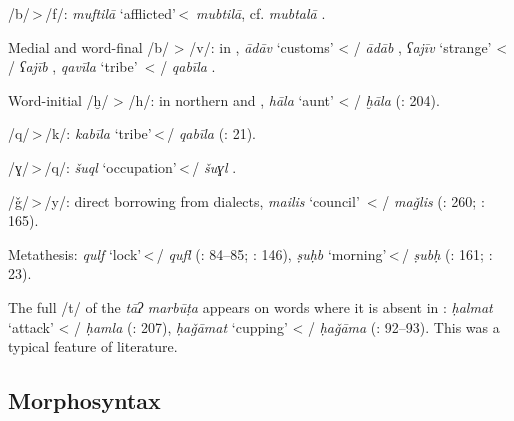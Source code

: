 \documentclass[output=paper]{langsci/langscibook}
\begin{document}
\begin{altdescription}
\item[/b/\,>\,/f/:] \emph{muftilā} ‘afflicted’\,<\, \textit{mubtilā}, cf.   \textit{mubtalā} \citep{Borjian2017}.

\item[Medial and word-final /b/ > /v/:]\sloppy in , \textit{ādāv} ‘customs’ < \slash{} \textit{ādāb} \citep[15]{Sarlak2002}, \textit{ʕajīv} ‘strange’ < \slash{} \textit{ʕajīb} \citep[25]{Sarlak2002}, \textit{qavīla} ‘tribe’~< / \textit{qabīla} \citep[199]{Sarlak2002}.

\item[Word-initial /ḫ/ > /h/:] in northern  and , \textit{hāla} ‘aunt’ < \slash{} \textit{ḫāla} (\citealt{Īzadpanāh2001}: 204).

\item[/q/\,>\,/k/:] \textit{kabīla} ‘tribe’\,<\,/ \textit{qabīla} (\citealt{NaǧībiFīni2002}: 21).

\item[/ɣ/\,>\,/q/:] \textit{šuql} ‘occupation’\,<\,/ \textit{šuɣl} \citep{Stilo2001}.

\item[/ǧ/\,>\,/y/:] direct borrowing from   dialects, \textit{mailis} ‘council’~< \slash{} \textit{maǧlis} (\citealt{Sarlak2002}: 260; \citealt{Fāẓilī2004}: 165).

\item[Metathesis:] \textit{qulf} ‘lock’\,<\,/ \textit{qufl} (\citealt{Salāmī2004}: 84–85; \citealt{ImāmAhwāzī2000}: 146), \textit{ṣuḥb} ‘morning’\,<\,/ \textit{ṣubḥ} (\citealt{Dānišgar1995}: 161; \citealt{NaǧībiFīni2002}: 23).
\end{altdescription}

The full /t/ of the \textit{tāʔ} \textit{marbūṭa} appears on words where it is absent in : \textit{ḥalmat} ‘attack’ < / \textit{ḥamla} (\citealt{Īzadpanāh2001}: 207), \textit{ḥaǧāmat} ‘cupping’ < / \textit{ḥaǧāma} (\citealt{Salāmī2004}: 92–93). This was a typical feature of  literature.

\subsection{Morphosyntax}
\end{document}
